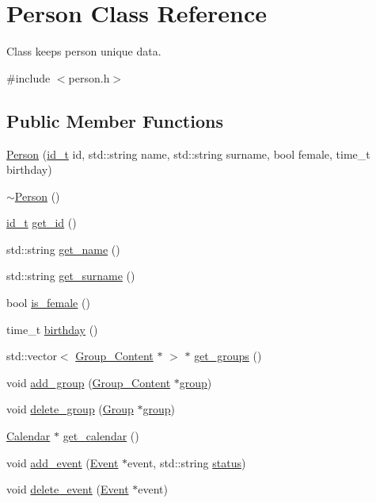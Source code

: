 \hypertarget{classPerson}{
\section{Person Class Reference}
\label{d1/d63/classPerson}
}


Class keeps person unique data.  




{\ttfamily \#include $<$person.h$>$}

\subsection*{Public Member Functions}
\begin{DoxyCompactItemize}
\item 
\hyperlink{classPerson_abceb8d57c311395b7f0c313fb8deb2e4}{Person} (\hyperlink{types_8h_ac948e8774f26ce7ea57a66b925e451b9}{id\_\-t} id, std::string name, std::string surname, bool female, time\_\-t birthday)
\item 
\hyperlink{classPerson_a700ffd693321c5fe6880262acf43d4da}{$\sim$Person} ()
\item 
\hyperlink{types_8h_ac948e8774f26ce7ea57a66b925e451b9}{id\_\-t} \hyperlink{classPerson_a3f54eedb2a7a5f1cdeb08732b58154ab}{get\_\-id} ()
\item 
std::string \hyperlink{classPerson_a1837ca2f4ba804aeee2a70c1a1fdd468}{get\_\-name} ()
\item 
std::string \hyperlink{classPerson_aad33f79ec5c96aa3ab30c9c4c989fb4b}{get\_\-surname} ()
\item 
bool \hyperlink{classPerson_a8bfe5b0c264f051b85812c692691e277}{is\_\-female} ()
\item 
time\_\-t \hyperlink{classPerson_aec14dd73ca58227cc70c4ba3a5065d02}{birthday} ()
\item 
std::vector$<$ \hyperlink{structGroup__Content}{Group\_\-Content} $\ast$ $>$ $\ast$ \hyperlink{classPerson_a24cd3ad56c42c1cd34505b1094e6e7d5}{get\_\-groups} ()
\item 
void \hyperlink{classPerson_aa17159e6bb16f2a42a1c4bcae08ae903}{add\_\-group} (\hyperlink{structGroup__Content}{Group\_\-Content} $\ast$\hyperlink{group__content_8h_a27517aa1480ab2d9bfe5d62e693b33eb}{group})
\item 
void \hyperlink{classPerson_a93dfe7e17e0316b1f7dddebf5fd3f7ce}{delete\_\-group} (\hyperlink{classGroup}{Group} $\ast$\hyperlink{group__content_8h_a27517aa1480ab2d9bfe5d62e693b33eb}{group})
\item 
\hyperlink{classCalendar}{Calendar} $\ast$ \hyperlink{classPerson_abaaac95db5394d3ad78ad08221b1d231}{get\_\-calendar} ()
\item 
void \hyperlink{classPerson_a57689e959d613756a806e5d32654d3e8}{add\_\-event} (\hyperlink{classEvent}{Event} $\ast$event, std::string \hyperlink{group__content_8h_ab4d38e7365d935f2a5f1403eec29127e}{status})
\item 
void \hyperlink{classPerson_ab788997b3b66a72e51f924d416029ff5}{delete\_\-event} (\hyperlink{classEvent}{Event} $\ast$event)
\end{DoxyCompactItemize}


